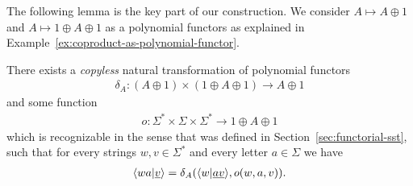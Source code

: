 The following lemma is the key part of our construction. We consider $A \mapsto A \oplus 1$ and $A \mapsto 1 \oplus A \oplus 1$ as a polynomial functors as explained in Example~\ref{ex:coproduct-as-polynomial-functor}.
\begin{lemma}\label{lem:compute-next-configuration}
    There exists a \emph{copyless} natural transformation of polynomial functors
    \begin{align*}
    \delta_A : (A \oplus 1) \times (1 \oplus A \oplus 1) \to A \oplus 1
    \end{align*} 
    and some function 
    \begin{align*}
    o : \Sigma^* \times \Sigma \times \Sigma^*  \to  1 \oplus A \oplus 1
    \end{align*}
    which is recognizable in the sense that was defined in Section~\ref{sec:functorial-sst}, such that  for every strings $w,v \in \Sigma^*$ and every letter $a \in \Sigma$ we have 
    \begin{align*}
    \langle wa|\underline v \rangle  = \delta_A(\langle w|\underline{av} \rangle, o(w,a,v)).
    \end{align*}
\end{lemma}
